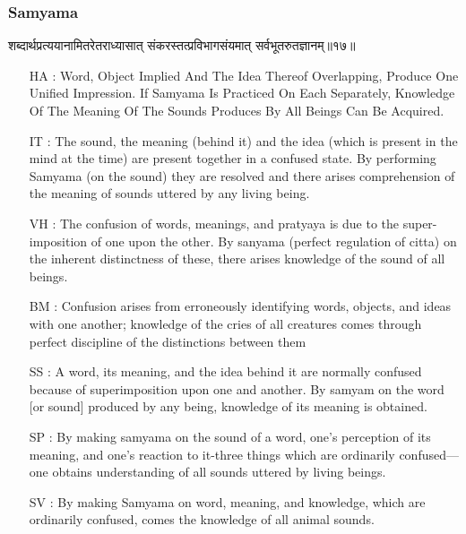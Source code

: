 \begin{frame}[fragile]\frametitle{Samyama}
\begin{sanskrit}
शब्दार्थप्रत्ययानामितरेतराध्यासात् संकरस्तत्प्रविभागसंयमात् सर्वभूतरुतज्ञानम्॥१७॥
\end{sanskrit}

	\begin{itemize}
	\item [HA]: Word, Object Implied And The Idea Thereof Overlapping, Produce One Unified Impression. If Samyama Is Practiced On Each Separately, Knowledge Of The Meaning Of The Sounds Produces By All Beings Can Be Acquired.
	\item [IT]: The sound, the meaning (behind it) and the idea (which is present in the mind at the time) are present together in a confused state. By performing Samyama (on the sound) they are resolved and there arises comprehension of the meaning of sounds uttered by any living being.
	\item [VH]: The confusion of words, meanings, and pratyaya is due to the super-imposition of one upon the other. By sanyama (perfect regulation of citta) on the inherent distinctness of these, there arises knowledge of the sound of all beings.
	\item [BM]: Confusion arises from erroneously identifying words, objects, and ideas with one another; knowledge of the cries of all creatures comes through perfect discipline of the distinctions between them
	\item [SS]: A word, its meaning, and the idea behind it are normally confused because of superimposition upon one and another. By samyam on the word [or sound] produced by any being, knowledge of its meaning is obtained.
	\item [SP]: By making samyama on the sound of a word, one’s perception of its meaning, and one’s reaction to it-three things which are ordinarily confused—one obtains understanding of all sounds uttered by living beings.
	\item [SV]: By making Samyama on word, meaning, and knowledge, which are ordinarily confused, comes the knowledge of all animal sounds. 
	\end{itemize}
\end{frame}

